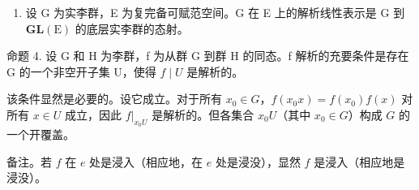 \begin{enumerate}
\def\labelenumi{(\arabic{enumi})}
\setcounter{enumi}{3}
\tightlist
\item
  设 G 为实李群，E 为复完备可赋范空间。G 在 E 上的解析线性表示是 G 到 \(\mathbf{GL}(\mathrm{E})\) 的底层实李群的态射。
\end{enumerate}

命题 4. 设 G 和 H 为李群，f 为从群 G 到群 H 的同态。f 解析的充要条件是存在 G 的一个非空开子集 U，使得 \(f \mid U\) 是解析的。

该条件显然是必要的。设它成立。对于所有 \(x_0 \in G\)，\(f(x_0x) = f(x_0)f(x)\) 对所有 \(x \in U\) 成立，因此 \(f|_{x_0U}\) 是解析的。但各集合 \(x_0U\)（其中 \(x_0 \in G\)）构成 \(G\) 的一个开覆盖。

备注。若 \(f\) 在 \(e\) 处是浸入（相应地，在 \(e\) 处是浸没），显然 \(f\) 是浸入（相应地是浸没）。

